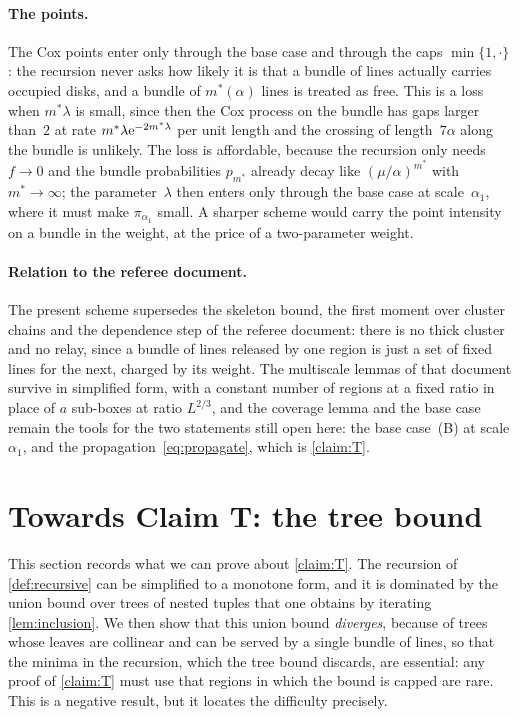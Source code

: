 \documentclass[11pt,letterpaper]{article}
\begin{document}
\paragraph{The points.} The Cox points enter only through the base case and through the caps $\min\{1,\cdot\}$: the recursion never asks how likely it is that a bundle of lines actually carries occupied disks, and a bundle of $m^*(\alpha)$ lines is treated as free. This is a loss when $m^*\lambda$ is small, since then the Cox process on the bundle has gaps larger than~$2$ at rate $m^*\lambda\mathrm{e}^{-2m^*\lambda}$ per unit length and the crossing of length~$7\alpha$ along the bundle is unlikely. The loss is affordable, because the recursion only needs $f\to0$ and the bundle probabilities $p_{m^*}$ already decay like $(\mu/\alpha)^{m^*}$ with $m^*\to\infty$; the parameter~$\lambda$ then enters only through the base case at scale~$\alpha_1$, where it must make $\pi_{\alpha_1}$ small. A sharper scheme would carry the point intensity on a bundle in the weight, at the price of a two-parameter weight.

\paragraph{Relation to the referee document.} The present scheme supersedes the skeleton bound, the first moment over cluster chains and the dependence step of the referee document: there is no thick cluster and no relay, since a bundle of lines released by one region is just a set of fixed lines for the next, charged by its weight. The multiscale lemmas of that document survive in simplified form, with a constant number of regions at a fixed ratio in place of $a$ sub-boxes at ratio $L^{2/3}$, and the coverage lemma and the base case remain the tools for the two statements still open here: the base case~(B) at scale $\alpha_1$, and the propagation~\eqref{eq:propagate}, which is \cref{claim:T}.

\section{Towards Claim T: the tree bound}
\label{sec:tree}

This section records what we can prove about \cref{claim:T}. The recursion of \cref{def:recursive} can be simplified to a monotone form, and it is dominated by the union bound over trees of nested tuples that one obtains by iterating \cref{lem:inclusion}. We then show that this union bound \emph{diverges}, because of trees whose leaves are collinear and can be served by a single bundle of lines, so that the minima in the recursion, which the tree bound discards, are essential: any proof of \cref{claim:T} must use that regions in which the bound is capped are rare. This is a negative result, but it locates the difficulty precisely.
\end{document}
